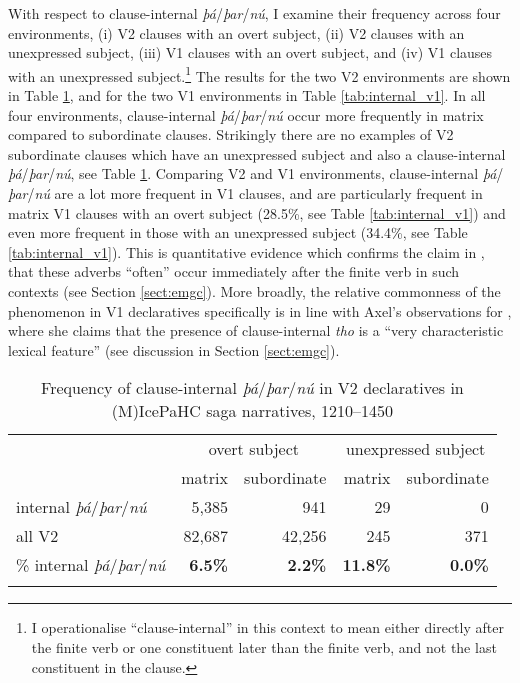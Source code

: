 \documentclass[output=paper,colorlinks,citecolor=brown]{langscibook}
\begin{document}
With respect to clause-internal \textit{þá}/\textit{þar}/\textit{nú}, I examine their frequency across four environments, (i) V2 clauses with an overt subject, (ii) V2 clauses with an unexpressed subject, (iii) V1 clauses with an overt subject, and (iv) V1 clauses with an unexpressed subject.\footnote{
I operationalise ``clause-internal'' in this context to mean either directly after the finite verb or one constituent later than the finite verb, and not the last constituent in the clause.}
The results for the two V2 environments are shown in Table \ref{tab:internal_v2}, and for the two V1 environments in Table \ref{tab:internal_v1}. In all four environments, clause-internal \textit{þá}/\textit{þar}/\textit{nú} occur more frequently in matrix compared to subordinate clauses. Strikingly there are no examples of V2 subordinate clauses which have an unexpressed subject and also a clause-internal \textit{þá}/\textit{þar}/\textit{nú}, see Table \ref{tab:internal_v2}. Comparing V2 and V1 environments, clause-internal \textit{þá}/\textit{þar}/\textit{nú} are a lot more frequent in V1 clauses, and are particularly frequent in matrix V1 clauses with an overt subject (28.5\%, see Table \ref{tab:internal_v1}) and even more frequent in those with an unexpressed subject (34.4\%, see Table \ref{tab:internal_v1}). This is quantitative evidence which confirms the claim in \citet[71]{Faarlund1990}, that these adverbs ``often'' occur immediately after the finite verb in such contexts (see Section \ref{sect:emgc}). More broadly, the relative commonness of the phenomenon in V1 declaratives specifically is in line with Axel's observations for , where she claims that the presence of clause-internal  \textit{tho} is a ``very characteristic lexical feature'' \citep[167]{Axel2007} (see discussion in Section \ref{sect:emgc}). 

\begin{table}
\caption{Frequency of clause-internal \textit{þá}/\textit{þar}/\textit{nú} in V2 declaratives in (M)IcePaHC saga narratives, 1210--1450}
\label{tab:internal_v2}
 \begin{tabularx}{.9\textwidth}{X rrrr}
  \lsptoprule
  &   \multicolumn{2}{c}{overt subject} &   \multicolumn{2}{c}{unexpressed subject}\\
   \cmidrule(lr){2-3}   \cmidrule(lr){4-5}
            & matrix & subordinate  & matrix & subordinate\\
  \midrule
  internal \textit{þá}/\textit{þar}/\textit{nú}  &  5,385   & 941     &   29       & 0 \\
  all V2                                         &  82,687 &  42,256   &   245    & 371 \\
 \% internal \textit{þá}/\textit{þar}/\textit{nú}  &  \textbf{6.5\%}  &  \textbf{2.2\%} & \textbf{11.8\%}  & \textbf{0.0\%}\\
  \lspbottomrule
 \end{tabularx}
\end{table}
\end{document}
